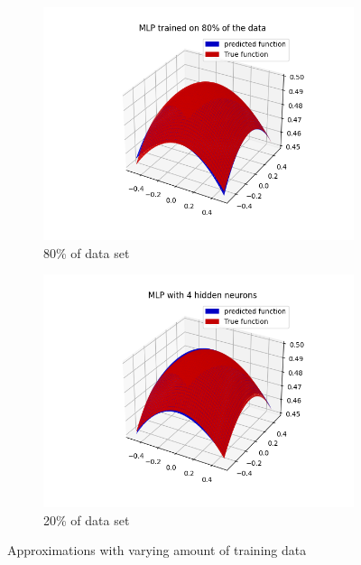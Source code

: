 \documentclass[a4paper]{article}
\begin{document}
\begin{figure}[ht]
    \centering
    \begin{subfigure}{0.4\textwidth}
        \centering
        \includegraphics[width=\textwidth]{Labs/Lab 1/Lab 1b/Figure/plots-0.8-train-data.png}
        \caption{80\% of data set}
    \end{subfigure}
    \hfill
    \begin{subfigure}{0.4\textwidth}
        \centering
        \includegraphics[width=\textwidth]{Labs/Lab 1/Lab 1b/Figure/plots-4-hidden-neurons.png}
        \caption{20\% of data set}
    \end{subfigure}
    \caption{Approximations with varying amount of training data}
    \label{fig:generalisation-regression}
\end{figure}
\end{document}
